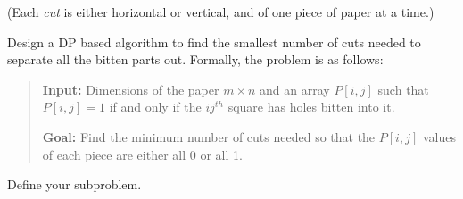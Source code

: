 \documentclass[11pt]{article}
\begin{document}
(Each {\it cut} is either horizontal or vertical, and of
one piece of paper at a time.)

Design a DP based algorithm to find the smallest number of cuts needed to separate all the bitten parts out.
%
Formally, the problem is as follows:

\begin{quote}
\textbf{Input:}  Dimensions of the paper $m \times n$ and an
array $P[i,j]$ such that $P[i,j] = 1$ if and only if the $ij^{th}$
square has holes bitten into it.

\textbf{Goal:} Find the minimum number of cuts needed so that the $P[i, j]$ values of each piece are either all 0 or all 1.
\end{quote}

\begin{subparts}
    \subpart Define your subproblem.


\end{subparts}
\end{document}
